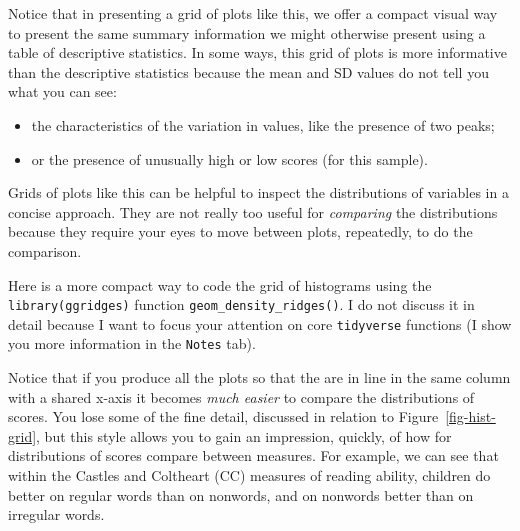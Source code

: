 \documentclass[
  letterpaper,
  DIV=11,
  numbers=noendperiod]{scrreprt}
\providecommand{\tightlist}{%
  \setlength{\itemsep}{0pt}\setlength{\parskip}{0pt}}\usepackage{longtable,booktabs,array}
\begin{document}
\begin{tcolorbox}[enhanced jigsaw, opacitybacktitle=0.6, title=\textcolor{quarto-callout-tip-color}{\faLightbulb}\hspace{0.5em}{Tip}, arc=.35mm, colbacktitle=quarto-callout-tip-color!10!white, colframe=quarto-callout-tip-color-frame, leftrule=.75mm, opacityback=0, breakable, titlerule=0mm, left=2mm, bottomrule=.15mm, toprule=.15mm, colback=white, coltitle=black, bottomtitle=1mm, toptitle=1mm, rightrule=.15mm]

Notice that in presenting a grid of plots like this, we offer a compact
visual way to present the same summary information we might otherwise
present using a table of descriptive statistics. In some ways, this grid
of plots is more informative than the descriptive statistics because the
mean and SD values do not tell you what you can see:

\begin{itemize}
\tightlist
\item
  the characteristics of the variation in values, like the presence of
  two peaks;
\item
  or the presence of unusually high or low scores (for this sample).
\end{itemize}

\end{tcolorbox}

Grids of plots like this can be helpful to inspect the distributions of
variables in a concise approach. They are not really too useful for
\emph{comparing} the distributions because they require your eyes to
move between plots, repeatedly, to do the comparison.

Here is a more compact way to code the grid of histograms using the
\texttt{library(ggridges)} function \texttt{geom\_density\_ridges()}. I
do not discuss it in detail because I want to focus your attention on
core \texttt{tidyverse} functions (I show you more information in the
\texttt{Notes} tab).

Notice that if you produce all the plots so that the are in line in the
same column with a shared x-axis it becomes \emph{much easier} to
compare the distributions of scores. You lose some of the fine detail,
discussed in relation to Figure~\ref{fig-hist-grid}, but this style
allows you to gain an impression, quickly, of how for distributions of
scores compare between measures. For example, we can see that within the
Castles and Coltheart (CC) measures of reading ability, children do
better on regular words than on nonwords, and on nonwords better than on
irregular words.
\end{document}
